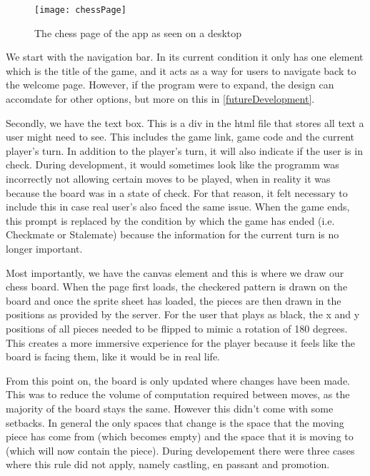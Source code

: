 \begin{figure}
    \begin{center}
        \texttt{[image: chessPage]}
        \caption{The chess page of the app as seen on a desktop}
    \end{center}
\end{figure}

We start with the navigation bar. In its current condition it only has one element which is the title of the game, and it acts as a way for users to navigate back to the welcome page. However, if the program were to expand, the design can accomdate for other options, but more on this in \ref{futureDevelopment}.

Secondly, we have the text box. This is a div in the html file that stores all text a user might need to see. This includes the game link, game code and the current player's turn. In addition to the player's turn, it will also indicate if the user is in check. During development, it would sometimes look like the programm was incorrectly not allowing certain moves to be played, when in reality it was because the board was in a state of check. For that reason, it felt necessary to include this in case real user's also faced the same issue. When the game ends, this prompt is replaced by the condition by which the game has ended (i.e. Checkmate or Stalemate) because the information for the current turn is no longer important.

Most importantly, we have the canvas element and this is where we draw our chess board. When the page first loads, the checkered pattern is drawn on the board and once the sprite sheet \cite{SpriteSheet} has loaded, the pieces are then drawn in the positions as provided by the server. For the user that plays as black, the x and y positions of all pieces needed to be flipped to mimic a rotation of 180 degrees. This creates a more immersive experience for the player because it feels like the board is facing them, like it would be in real life.

From this point on, the board is only updated where changes have been made. This was to reduce the volume of computation required between moves, as the majority of the board stays the same. However this didn't come with some setbacks. In general the only spaces that change is the space that the moving piece has come from (which becomes empty) and the space that it is moving to (which will now contain the piece). During developement there were three cases where this rule did not apply, namely castling, en passant and promotion.

